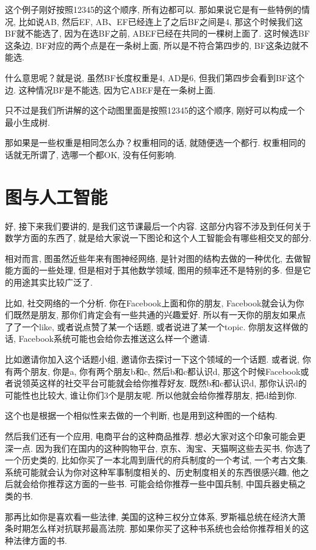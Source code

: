 这个例子刚好按照12345的这个顺序, 所有边都可以. 那如果说它是有一些特例的情况, 比如说AB, 然后EF, AB、EF已经连上了之后BF之间是4, 那这个时候我们这BF就不能选了, 因为在选BF之前, ABEF已经在共同的一棵树上面了. 这时候选BF这条边, BF对应的两个点是在一条树上面, 所以是不符合第四步的, BF这条边就不能选. 

什么意思呢？就是说, 虽然BF长度权重是4, AD是6, 但我们第四步会看到BF这个边. 这种情况BF是不能选, 因为它ABEF是在一条树上面. 

只不过是我们所讲解的这个动图里面是按照12345的这个顺序, 刚好可以构成一个最小生成树. 

那如果是一些权重是相同怎么办？权重相同的话, 就随便选一个都行. 权重相同的话就无所谓了, 选哪一个都OK, 没有任何影响. 

\section{图与人工智能}

好, 接下来我们要讲的, 是我们这节课最后一个内容. 这部分内容不涉及到任何关于数学方面的东西了, 就是给大家说一下图论和这个人工智能会有哪些相交叉的部分. 

相对而言, 图虽然近些年来有图神经网络, 是针对图的结构去做的一种优化, 去做智能方面的一些处理, 但是相对于其他数学领域, 图用的频率还不是特别的多. 但是它的用途其实比较广泛了. 

比如, 社交网络的一个分析. 你在Facebook上面和你的朋友, Facebook就会认为你们既然是朋友, 那你们肯定会有一些共通的兴趣爱好. 所以有一天你的朋友如果点了了一个like, 或者说点赞了某一个话题, 或者说进了某一个topic. 你朋友这样做的话, Facebook系统可能也会给你去推送这么样一个邀请. 

比如邀请你加入这个话题小组, 邀请你去探讨一下这个领域的一个话题. 或者说, 你有两个朋友, 你是a, 你有两个朋友b和c, 然后b和c都认识d, 那这个时候Facebook或者说领英这样的社交平台可能就会给你推荐好友. 既然b和c都认识d, 那你认识d的可能性也比较大, 谁让你们3个是朋友呢. 所以他就会给你推荐朋友, 把d给到你. 

这个也是根据一个相似性来去做的一个判断, 也是用到这种图的一个结构. 

然后我们还有一个应用, 电商平台的这种商品推荐. 想必大家对这个印象可能会更深一点. 因为我们在国内的这种购物平台, 京东、淘宝、天猫啊这些去买书, 你选了一个历史类的, 比如你买了一本北周到唐代的府兵制度的一个考试, 一个考古文集. 系统可能就会认为你对这种军事制度相关的、历史制度相关的东西很感兴趣, 他之后就会给你推荐这方面的一些书. 可能会给你推荐一些中国兵制, 中国兵器史稿之类的书. 

那再比如你是喜欢看一些法律, 美国的这种三权分立体系, 罗斯福总统在经济大萧条时期怎么样对抗联邦最高法院. 那如果你买了这种书系统也会给你推荐相关的这种法律方面的书. 

